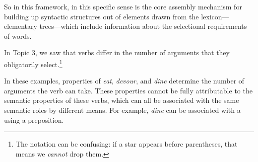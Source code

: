 \documentclass{article}
\begin{document}
\begin{exe}
    \label{PP_forcats}
\end{exe}
So in this framework,  in this specific sense is the core assembly mechanism for building up syntactic structures out of elements drawn from the lexicon---elementary trees---which include information about the selectional requirements of words.


In Topic 3, we saw that verbs differ in the number of arguments that they obligatorily select.\footnote{The notation can be confusing: if a star appears before parentheses, that means we \emph{cannot} drop them.}
\begin{exe}
\end{exe}
In these examples, properties of \emph{eat}, \emph{devour}, and \emph{dine} determine the number of arguments the verb can take.
These properties cannot be fully attributable to the semantic properties of these verbs, which can all be associated with the same semantic roles by different means.
For example, \emph{dine} can be associated with a  using a preposition.
\begin{exe}
\end{exe}
\end{document}
